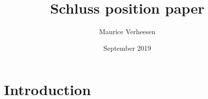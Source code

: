 \documentclass{article}
\title{Schluss position paper}
\author{Maurice Verheesen}
\date{September 2019}
\begin{document}
\maketitle

\section{Introduction}
\end{document}
